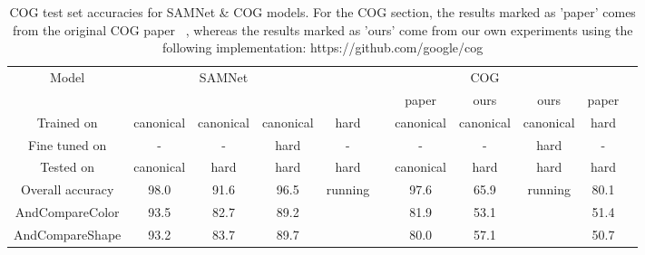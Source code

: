 \begin{table}[t]
	\tiny
	
	\caption{COG test set accuracies for  SAMNet \& COG models. For the COG section, the results marked as 'paper' comes from the original COG paper ~\cite{yang2018dataset}, whereas the results marked as 'ours' come from our own experiments using the following implementation: https://github.com/google/cog }
	
	\centering
	\begin{tabular}{ccccccccccc}
		\toprule
		Model & & SAMNet & && && COG&& \\
		\cmidrule{2-5} \cmidrule{7-11} 
		&&&&& & paper & ours & ours & paper&\\
		\cmidrule{7-9} \cmidrule{10-11}
		Trained on       & canonical & canonical & canonical & hard &           &  canonical  & canonical  & canonical & hard \\ 
		Fine tuned on  & - & - & hard  & - &           & -   & - & hard & - \\ 
		Tested on        & canonical & hard & hard & hard &            &canonical  & hard & hard & hard  \\ 
		\midrule
		
		Overall accuracy & 98.0 & 91.6 & 96.5  & running &           & 97.6  & 65.9 & running& 80.1 \\ 
		
		\midrule 
		
		
		AndCompareColor	&	93.5		&	82.7	&	89.2	&&		&81.9	&53.1&&	51.4
\\ 
		AndCompareShape	&	93.2 		&	83.7	&	89.7	&&	&	80.0	&57.1	&&50.7\\ 

		
		
		
		
		
		
		
		\bottomrule
	\end{tabular}
	\label{results}
\end{table}


